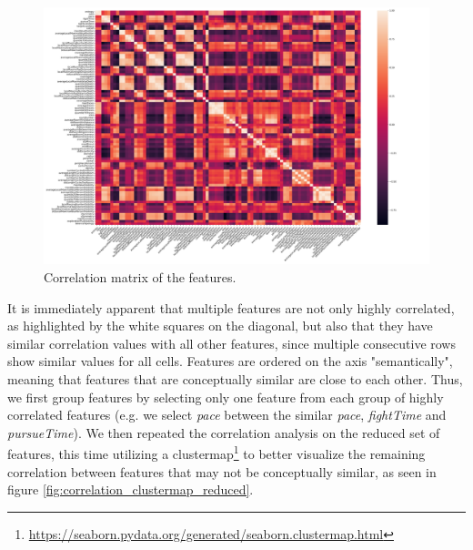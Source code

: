 \begin{figure}[hbt!]
    \centering
    \includegraphics[width=1.0\textwidth]{images/covariance_map_full.png}
    \caption{Correlation matrix of the features.}
    \label{fig:correlation_matrix_full}
\end{figure}

It is immediately apparent that multiple features are not only highly correlated, as highlighted by the white squares on the diagonal, but also that they have similar correlation values with all other features, since multiple consecutive rows show similar values for all cells. Features are ordered on the axis "semantically", meaning that features that are conceptually similar are close to each other. Thus, we first group features by selecting only one feature from each group of highly correlated features (e.g. we select \textit{pace} between the similar \textit{pace}, \textit{fightTime} and \textit{pursueTime}). We then repeated the correlation analysis on the reduced set of features, this time utilizing a clustermap\footnote{\url{https://seaborn.pydata.org/generated/seaborn.clustermap.html}} to better visualize the remaining correlation between features that may not be conceptually similar, as seen in figure \cref{fig:correlation_clustermap_reduced}.

